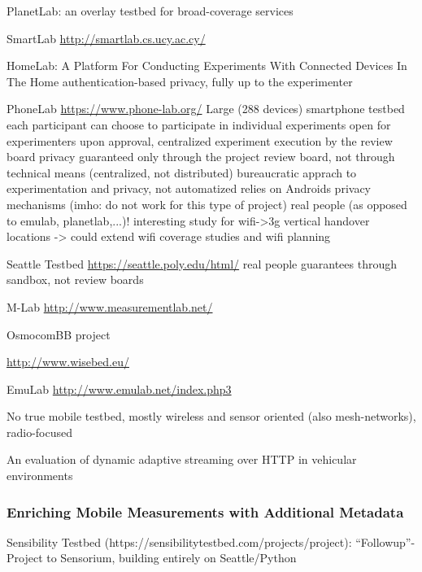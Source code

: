 PlanetLab: an overlay testbed for broad-coverage services \cite{chun2003planetlab}



SmartLab \url{http://smartlab.cs.ucy.ac.cy/}

HomeLab: A Platform For Conducting Experiments With Connected Devices In The Home \cite{Singh:2013:HPC:2486001.2491701}
authentication-based privacy, fully up to the experimenter

PhoneLab \url{https://www.phone-lab.org/} \cite{Nandugudi:2013:PLP:2536714.2536718}
Large (288 devices) smartphone testbed
each participant can choose to participate in individual experiments
open for experimenters upon approval, centralized experiment execution by the review board
privacy guaranteed only through the project review board, not through technical means (centralized, not distributed)
bureaucratic apprach to experimentation and privacy, not automatized
relies on Androids privacy mechanisms (imho: do not work for this type of project)
real people (as opposed to emulab, planetlab,...)!
interesting study for wifi->3g vertical handover locations -> could extend wifi coverage studies and wifi planning


Seattle Testbed \url{https://seattle.poly.edu/html/} \cite{Cappos:2009:SPE:1508865.1508905}
real people
guarantees through sandbox, not review boards

M-Lab \url{http://www.measurementlab.net/}

OsmocomBB project \cite{osmocombbwww}

\url{http://www.wisebed.eu/}

EmuLab \url{http://www.emulab.net/index.php3}


No true mobile testbed, mostly wireless and sensor oriented (also mesh-networks), radio-focused

An evaluation of dynamic adaptive streaming over \gls{HTTP} in vehicular environments \cite{Muller:2012:EDA:2151677.2151686}

\subsubsection{Enriching Mobile Measurements with Additional Metadata}
\label{c5:sensorium}



Sensibility Testbed (https://sensibilitytestbed.com/projects/project): ``Followup''-Project to Sensorium, building entirely on Seattle/Python



